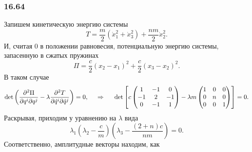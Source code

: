 \subsubsection*{16.64}
Запишем кинетическую энергию системы
\begin{equation*}
    T = \frac{m}{2} \left(
        \dot{x}_1^2 + \dot{x}_3^2
    \right) + \frac{nm}{2} \dot{x}_2^2.
\end{equation*}
И, считая $0$ в положении равновесия, потенциальную энергию системы, запасенную в сжатых пружинах
\begin{equation*}
    \Pi = \frac{c}{2} (x_2 - x_1)^2 + \frac{c}{2} (x_3 - x_2)^2.
\end{equation*}
В таком случае
\begin{equation*}
     \det \left(
     \frac{\partial^2 \Pi}{\partial q^i \partial q^j} - \lambda \frac{\partial^2 T}{\partial \dot{q}^i \partial \dot{q}^j}\right) = 0,
     \hspace{0.5cm} \Rightarrow \hspace{0.5cm}
     \det\left[
        c \begin{pmatrix}
            1 & -1 & 0 \\
            -1 & 2 & -1 \\
            0 & -1 & 1 \\
        \end{pmatrix} - \lambda 
        m \begin{pmatrix}
            1 & 0 & 0 \\
            0 & n & 0 \\
            0 & 0 & 1 \\
        \end{pmatrix}
     \right] = 0.
\end{equation*}
Раскрывая, приходим у уравнению на $\lambda$ вида
\begin{equation*}
    \lambda_1 \left(
        \lambda_2 - \frac{c}{m}
    \right)\left(
        \lambda_3 - \frac{(2+n)c}{nm}
    \right) = 0.
\end{equation*}
Соответственно, амплитудные векторы находим, как
